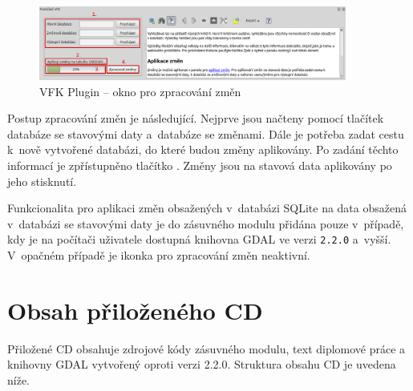 \documentclass[a4paper,12pt,oneside]{book}
\begin{document}
\begin{figure}[htb]
\centering
\includegraphics[width=0.9\textwidth]{images/vfkPlugin-prirucka_zmeny.png}
\caption[VFK Plugin -- okno pro zpracování změn]{VFK Plugin -- okno pro zpracování změn}
\label{l_plugin_zmeny}
\end{figure}

Postup zpracování změn je následující. Nejprve jsou načteny pomocí
tlačítek  databáze se stavovými daty a~databáze se
změnami. Dále je potřeba zadat cestu k~nově vytvořené databázi, do
které budou změny aplikovány. Po zadání těchto informací je
zpřístupněno tlačítko . Změny jsou na stavová data
aplikovány po jeho stisknutí.

Funkcionalita pro aplikaci změn obsažených v~databázi SQLite na data
obsažená v~databázi se stavovými daty je do zásuvného modulu přidána
pouze v~případě, kdy je na počítači uživatele dostupná knihovna GDAL
ve verzi \texttt{2.2.0} a~vyšší. V~opačném případě je ikonka pro
zpracování změn neaktivní.

\chapter{Obsah přiloženého CD}

Přiložené CD obsahuje zdrojové kódy zásuvného modulu, text diplomové
práce a~ knihovny GDAL vytvořený oproti verzi 2.2.0. Struktura
obsahu CD je uvedena níže.

\begin{minipage}{0.9\textwidth}
\end{minipage}
\end{document}
